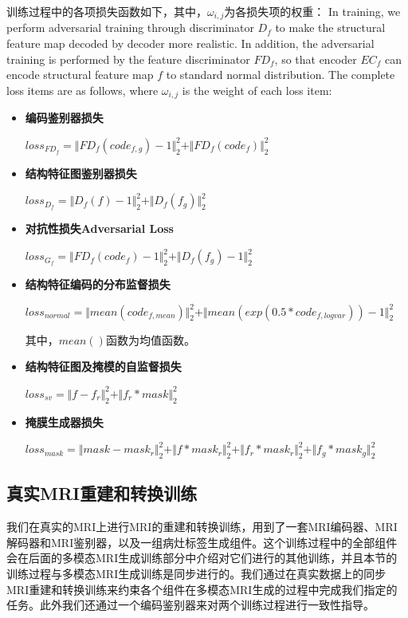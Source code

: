 \documentclass[letterpaper]{article} %
\begin{document}
训练过程中的各项损失函数如下，其中，$\omega_{i,j}$为各损失项的权重：
In training, we perform adversarial training through discriminator $D_f$ to make the structural feature map decoded by decoder more realistic. In addition, the adversarial training is performed by the feature discriminator $FD_f$, so that encoder $EC_f$ can encode structural feature map $f$ to standard normal distribution. The complete loss items are as follows, where $\omega_{i,j}$ is the weight of each loss item: 
\begin{itemize}
	\item \textbf{编码鉴别器损失} 
	\begin{center}
		$loss_{FD_f}=\Vert{FD_f(code_{f,g})-1}\Vert_{2}^{2}+\Vert{FD_f(code_f)}\Vert_{2}^{2}$
	\end{center}
	
	\item \textbf{结构特征图鉴别器损失} 
	\begin{center}
		$loss_{D_f}=\Vert{D_f(f)-1}\Vert_{2}^{2}+\Vert{D_f(f_g )}\Vert_{2}^{2}$
	\end{center}
	
	\item \textbf{对抗性损失Adversarial Loss} 
	\begin{center}
		$loss_{G_f}=\Vert{FD_f(code_f)-1}\Vert_{2}^{2}+\Vert{D_f(f_g)-1}\Vert_{2}^{2}$
	\end{center}
	
	\item \textbf{结构特征编码的分布监督损失} 
	\begin{center}
		$loss_{normal}=\Vert{mean(code_{f,mean})}\Vert_{2}^{2}+ \Vert{mean(exp(0.5*code_{f,logvar}))-1}\Vert_{2}^{2}$
	\end{center}
	其中，$mean()$函数为均值函数。
	
	\item \textbf{结构特征图及掩模的自监督损失} 
	\begin{center}
		$loss_{sv}=\Vert{f-f_r}\Vert_{2}^{2}+\Vert{f_r*mask}\Vert_{2}^{2}$
	\end{center}
	
	\item \textbf{掩膜生成器损失}
	\begin{center}
		$loss_{mask}=\Vert{mask-mask_r }\Vert_{2}^{2}+\Vert{f*mask_r}\Vert_{2}^{2}+\Vert{f_r*mask_r}\Vert_{2}^{2}+\Vert{f_g*mask_g}\Vert_{2}^{2}$
	\end{center}
\end{itemize}

\subsection{真实MRI重建和转换训练}
我们在真实的MRI上进行MRI的重建和转换训练，用到了一套MRI编码器、MRI解码器和MRI鉴别器，以及一组病灶标签生成组件。这个训练过程中的全部组件会在后面的多模态MRI生成训练部分中介绍对它们进行的其他训练，并且本节的训练过程与多模态MRI生成训练是同步进行的。我们通过在真实数据上的同步MRI重建和转换训练来约束各个组件在多模态MRI生成的过程中完成我们指定的任务。此外我们还通过一个编码鉴别器来对两个训练过程进行一致性指导。
\end{document}
